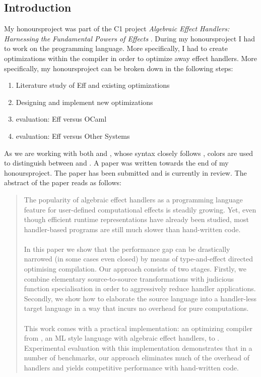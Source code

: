 \subsection{Introduction}
My honoursproject was part of the C1 project \textit{Algebraic Effect Handlers: Harnessing the Fundamental Powers of Effects} \cite{project}. During my honoursproject I had to work on the \eff programming language. More specifically, I had to create optimizations within the compiler in order to optimize away effect handlers. More specifically, my honoursproject can be broken down in the following steps:
\begin{enumerate}
\item Literature study of Eff and existing optimizations 
\item Designing and implement new optimizations
\item evaluation: Eff versus OCaml
\item evaluation: Eff versus Other Systems
\end{enumerate}
As we are working with both \ocaml and \eff, whose syntax closely follows \ocaml, colors are used to distinguish between  and . A paper was written towards the end of my honoursproject. The paper has been submitted and is currently in review. The abstract of the paper reads as follows: \cite{own}
\begin{quotation}
\noindent The popularity of algebraic effect handlers as a programming language feature for user-defined computational effects is steadily growing. Yet, even though efficient runtime representations have already been studied, most handler-based programs are still much slower than hand-written code.\\
\\
In this paper we show that the performance gap can be drastically narrowed (in some cases even closed) by means of type-and-effect directed optimising compilation. Our approach consists of two stages. Firstly, we combine elementary source-to-source transformations with judicious function specialisation in order to aggressively reduce handler applications. Secondly, we show how to elaborate the source language into a handler-less target language in a way that incurs no overhead for pure computations.\\
\\
This work comes with a practical implementation: an optimizing compiler from \eff, an ML style language with algebraic effect handlers, to \ocaml. Experimental evaluation with this implementation demonstrates that in a number of benchmarks, our approach eliminates much of the overhead of handlers and yields competitive performance with hand-written \ocaml code.
\end{quotation}


